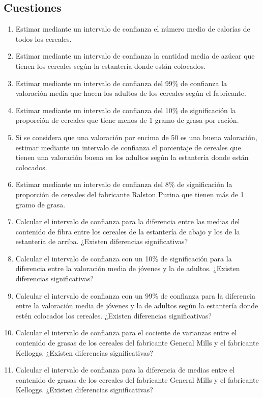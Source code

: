\documentclass[a4paper,titlepage]{article}
\begin{document}
\subsection*{\color{blueceu}Cuestiones}
\begin{enumerate}[leftmargin=*]
\item Estimar mediante un intervalo de confianza el número medio de calorías de todos los cereales.
\item Estimar mediante un intervalo de confianza la cantidad media de azúcar que tienen los cereales según la estantería donde están colocados.
\item Estimar mediante un intervalo de confianza del 99\% de confianza la valoración media que hacen los adultos de los cereales según el fabricante.
\item Estimar mediante un intervalo de confianza del 10\% de significación la proporción de cereales que tiene menos de 1 gramo de grasa por ración.
\item Si se considera que una valoración por encima de 50 es una buena valoración, estimar mediante un intervalo de confianza el porcentaje de cereales que tienen una valoración buena en los adultos según la estantería donde están colocados.
\item Estimar mediante un intervalo de confianza del 8\% de significación la proporción de cereales del fabricante Ralston Purina que tienen más de 1 gramo de grasa.
\item Calcular el intervalo de confianza para la diferencia entre las medias del contenido de fibra entre los cereales de la estantería de abajo y los de la estantería de arriba. ¿Existen diferencias significativas?
\item Calcular el intervalo de confianza con un 10\% de significación para la diferencia entre la valoración media de jóvenes y la de adultos. ¿Existen diferencias significativas?
\item Calcular el intervalo de confianza con un 99\% de confianza para la diferencia entre la valoración media de jóvenes y la de adultos según la estantería donde estén colocados los cereales. ¿Existen diferencias significativas?
\item Calcular el intervalo de confianza para el cociente de varianzas entre el contenido de grasas de los cereales del fabricante General Mills y el fabricante Kelloggs. ¿Existen diferencias significativas?
\item Calcular el intervalo de confianza para la diferencia de medias entre el contenido de grasas de los cereales del fabricante General Mills y el fabricante Kelloggs. ¿Existen diferencias significativas?

\end{enumerate}
\end{document}
